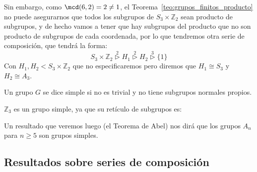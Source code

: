 \begin{ejemplo}
\begin{itemize}
            Sin embargo, como $\mcd(6,2) = 2 \neq 1$, el Teorema~\ref{teo:grupos_finitos_producto} no puede asegurarnos que todos los subgrupos de $S_3\times \mathbb{Z}_2$ sean producto de subgrupos, y de hecho vamos a tener que hay subgrupos del producto que no son producto de subgrupos de cada coordenada, por lo que tendremos otra serie de composición, que tendrá la forma:
            \begin{equation*}
                S_3\times \mathbb{Z}_2 \stackrel{2}{\rhd} H_1 \stackrel{2}{\rhd} H_2 \stackrel{3}{\rhd} \{1\}
            \end{equation*}
            Con $H_1,H_2 < S_3\times \mathbb{Z}_2$ que no especificaremos pero diremos que $H_1\cong S_3$ y $H_2\cong A_3$.
    \end{itemize}
\end{ejemplo}

\begin{definicion}
    Un grupo $G$ se dice simple si no es trivial y no tiene subgrupos normales propios.
\end{definicion}

\begin{ejemplo}
    $\mathbb{Z}_3$ es un grupo simple, ya que su retículo de subgrupos es:
    \begin{figure}[H]
        \centering
    \end{figure}
    \noindent
    Un resultado que veremos luego (el Teorema de Abel) nos dirá que los grupos $A_n$ para $n\geq 5$ son grupos simples.
\end{ejemplo}

\newpage
\subsection{Resultados sobre series de composición}

